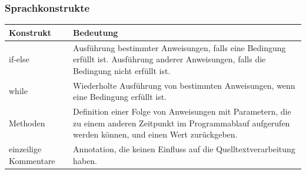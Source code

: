 \documentclass[a4paper,10pt]{article}
\begin{document}
\subsubsection{Sprachkonstrukte}
\begin{tabularx}{\textwidth}{| l | X |}
\hline
\textbf{Konstrukt} & \textbf{Bedeutung}\\
\hline
if-else & Ausführung bestimmter Anweisungen, falls eine Bedingung erfüllt ist. Ausführung anderer Anweisungen, falls die Bedingung nicht erfüllt ist.\\
\hline
while & Wiederholte Ausführung von bestimmten Anweisungen, wenn eine Bedingung erfüllt ist.\\
\hline
Methoden & Definition einer Folge von Anweisungen mit Parametern, die zu einem anderen Zeitpunkt im Programmablauf aufgerufen werden können, und einen Wert zurückgeben.\\
\hline
einzeilige Kommentare & Annotation, die keinen Einfluss auf die Quelltextverarbeitung haben.\\
\hline
\end{tabularx}
\end{document}
